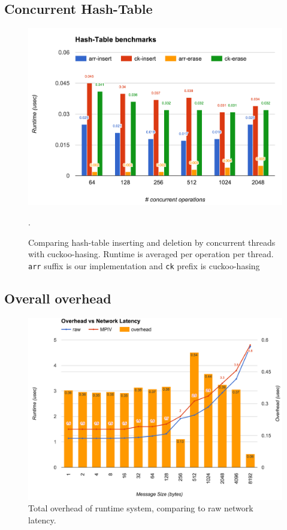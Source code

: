 \documentclass[11pt]{article}
\begin{document}
\subsection{Concurrent Hash-Table}
\begin{figure}[h!]
  \centering 
  \includegraphics[width=\textwidth]{fig/hashtbl.png}
  \caption{Comparing hash-table inserting and deletion by concurrent threads
    with cuckoo-hasing.  Runtime is averaged per operation per thread.
    \texttt{arr} suffix is our implementation and \texttt{ck} prefix is cuckoo-hasing}.
\end{figure}

\newpage

\subsection{Overall overhead}
\begin{figure}[h!]
  \centering 
  \includegraphics[width=\textwidth]{fig/overhead.png}
  \caption{Total overhead of runtime system, comparing to raw network latency.}
\end{figure}
\end{document}

